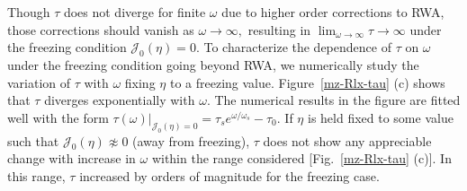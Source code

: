 \documentclass[reprint,preprintnumbers,showpacs,amsmath,twocolumn,showkeys,aps,prl]{revtex4-1}
\begin{document}
Though $\tau$ does not diverge for finite $\omega$ due to higher order corrections to 
RWA, those corrections should vanish as $\omega \to \infty,$ 
resulting in $\lim_{\omega\to\infty}\tau\to\infty$
under the freezing condition ${\mathcal J}_{0}(\eta)=0.$ To characterize the dependence of $\tau$ on $\omega$ 
under the freezing condition going beyond RWA, 
we numerically study the variation of $\tau$ with $\omega$ fixing $\eta$ to a freezing value. 
Figure~\ref{mz-Rlx-tau} (c) shows that $\tau$  
diverges exponentially with $\omega$. The numerical results in the figure are  
fitted well with the form $\tau(\omega)\bigr|_{{\mathcal J}_{0}(\eta)=0} =  \tau_{s}e^{{\omega}/{\omega_{s}}}-\tau_0$. 
If $\eta$ is held fixed to some value such that ${\mathcal J}_{0}(\eta) \not\approx 0$ (away from freezing), $\tau$ does not show
any appreciable change with increase in $\omega$ within the range considered [Fig.~\ref{mz-Rlx-tau} (c)]. In this range,
$\tau$ increased by orders of magnitude for the freezing case. \\
\end{document}
